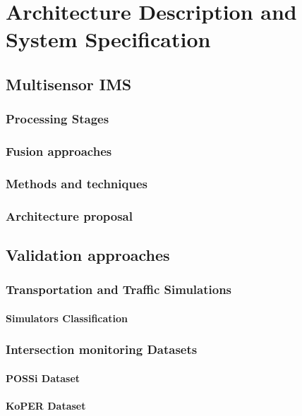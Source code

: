 %		

\chapter {Architecture Description and System Specification}
\section{Multisensor IMS}
\subsection{Processing Stages}
\subsection{Fusion approaches}
\subsection{Methods and techniques}
\subsection{Architecture proposal}
\section{Validation approaches}
\subsection{Transportation and Traffic Simulations}
\subsubsection{Simulators Classification}
\subsection{Intersection monitoring Datasets}
\subsubsection{POSSi Dataset}
\subsubsection{KoPER Dataset}